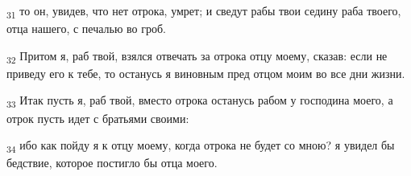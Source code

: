 \begin{tcolorbox}
\textsubscript{31} то он, увидев, что нет отрока, умрет; и сведут рабы твои седину раба твоего, отца нашего, с печалью во гроб.
\end{tcolorbox}
\begin{tcolorbox}
\textsubscript{32} Притом я, раб твой, взялся отвечать за отрока отцу моему, сказав: если не приведу его к тебе, то останусь я виновным пред отцом моим во все дни жизни.
\end{tcolorbox}
\begin{tcolorbox}
\textsubscript{33} Итак пусть я, раб твой, вместо отрока останусь рабом у господина моего, а отрок пусть идет с братьями своими:
\end{tcolorbox}
\begin{tcolorbox}
\textsubscript{34} ибо как пойду я к отцу моему, когда отрока не будет со мною? я увидел бы бедствие, которое постигло бы отца моего.
\end{tcolorbox}

